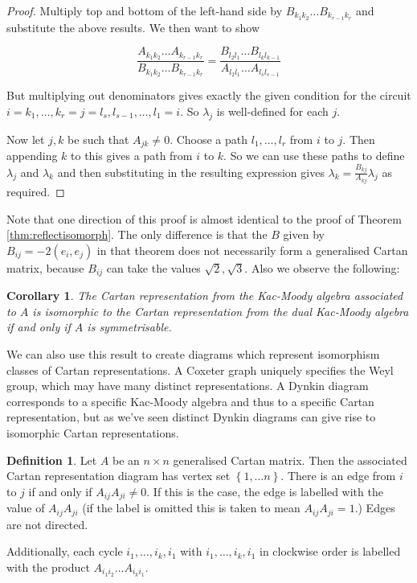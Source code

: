 \documentclass[11pt,a4paper]{report}
\newtheorem{corollary}[theorem]{Corollary}
\theoremstyle{definition}
\newtheorem{definition}[theorem]{Definition}
\begin{document}
\begin{proof}
Multiply top and bottom of the left-hand side by $B_{k_1k_2} \ldots B_{k_{r-1}k_r}$ and substitute the above results. We then want to show 

\begin{equation*} \frac{A_{k_1k_2} \ldots A_{k_{r-1} k_r}}{B_{k_1k_2} \ldots B_{k_{r-1} k_r}} = \frac{B_{l_2l_1} \ldots B_{l_k l_{k-1}}}{A_{l_2l_1} \ldots A_{l_s l_{s-1}}}\end{equation*} 

But multiplying out denominators gives exactly the given condition for the circuit $i = k_1, \ldots, k_r = j = l_s, l_{s-1}, \ldots, l_1 = i$. So $\lambda_j$ is well-defined for each $j$.

Now let $j, k$ be such that $A_{jk} \neq 0$. Choose a path $l_1, \ldots, l_r$ from $i$ to $j$. Then appending $k$ to this gives a path from $i$ to $k$. So we can use these paths to define $\lambda_j$ and $\lambda_k$ and then substituting in the resulting expression gives $\lambda_k = \frac{B_{kj}}{A_{kj}} \lambda_j$ as required. \end{proof}

Note that one direction of this proof is almost identical to the proof of Theorem \ref{thm:reflectisomorph}. The only difference is that the $B$ given by $B_{ij} =-  2 (e_i, e_j)$ in that theorem does not necessarily form a generalised Cartan matrix, because $B_{ij}$ can take the values $\sqrt{2}, \sqrt{3}$. Also we observe the following: 

\begin{corollary} \label{cor:dualisomorphcond} The Cartan representation from the Kac-Moody algebra associated to $A$ is isomorphic to the Cartan representation from the dual Kac-Moody algebra if and only if $A$ is symmetrisable. \end{corollary}

We can also use this result to create diagrams which represent isomorphism classes of Cartan representations. A Coxeter graph uniquely specifies the Weyl group, which may have many distinct representations. A Dynkin diagram corresponds to a specific Kac-Moody algebra and thus to a specific Cartan representation, but as we've seen distinct Dynkin diagrams can give rise to isomorphic Cartan representations.

\begin{definition} Let $A$ be an $n \times n$ generalised Cartan matrix. Then the associated Cartan representation diagram has vertex set $\left\{1, \ldots n\right\}$. There is an edge from $i$ to $j$ if and only if $A_{ij} A_{ji} \neq 0$. If this is the case, the edge is labelled with the value of $A_{ij} A_{ji}$ (if the label is omitted this is taken to mean $A_{ij} A_{ji} = 1$.) Edges are not directed.

Additionally, each cycle $i_1, \ldots,i_k, i_1$ with $i_1,\ldots, i_k, i_1$ in clockwise order is labelled with the product $A_{i_1i_2} \ldots A_{i_ki_1}$.
\end{definition}
\end{document}

